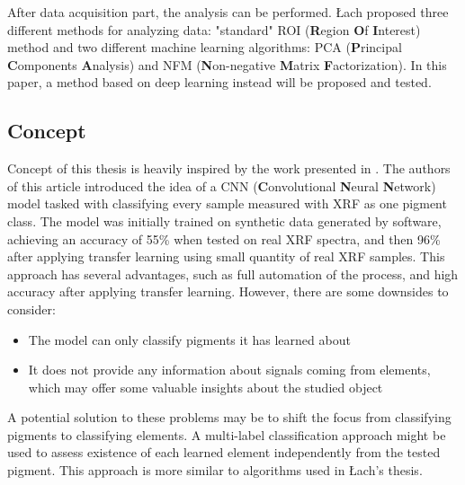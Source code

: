 After data acquisition part, the analysis can be performed. 
Łach proposed three different methods for analyzing data: "standard" ROI (\textbf{R}egion \textbf{O}f \textbf{I}nterest) method and two different machine learning algorithms: PCA (\textbf{P}rincipal \textbf{C}omponents \textbf{A}nalysis) and NFM (\textbf{N}on-negative \textbf{M}atrix \textbf{F}actorization). 
In this paper, a method based on deep learning instead will be proposed and tested. 

\subsection{Concept}
Concept of this thesis is heavily inspired by the work presented in \cite{Jones2022}. 
The authors of this article introduced the idea of a CNN (\textbf{C}onvolutional \textbf{N}eural \textbf{N}etwork) model tasked with classifying every sample measured with XRF as one pigment class. 
The model was initially trained on synthetic data generated by software, achieving an accuracy of 55\% when tested on real XRF spectra, and then 96\% after applying transfer learning using small quantity of real XRF samples.  
This approach has several advantages, such as full automation of the process, and high accuracy after applying transfer learning.
However, there are some downsides to consider:
\begin{itemize}
    \item The model can only classify pigments it has learned about
    \item It does not provide any information about signals coming from elements, which may offer some valuable insights about the studied object
\end{itemize}
A potential solution to these problems may be to shift the focus from classifying pigments to classifying elements. A multi-label classification approach might be used to assess existence of each learned element independently from the tested pigment. This approach is more similar to algorithms used in Łach's thesis.
